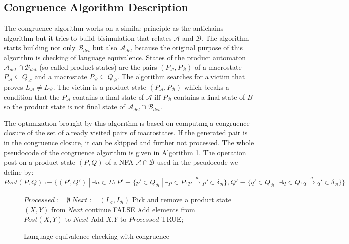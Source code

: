  \subsection{Congruence Algorithm Description}
\label{subsectCongr}
The congruence algorithm works on a similar principle as the antichains algorithm but  %
it tries to build bisimulation that relates $\mathcal{A}$ and $\mathcal{B}$. The algorithm starts building not only $\mathcal{B}_{det}$ 
but also $\mathcal{A}_{det}$ because the original purpose of this algorithm is checking of 
language equivalence. States of the product automaton $\mathcal{A}_{det} \cap \mathcal{B}_{det}$  (so-called product states) are the pairs 
$(P_\mathcal{A},P_\mathcal{B})$ of a macrostate $P_\mathcal{A} \subseteq Q_\mathcal{A}$ and a macrostate
$P_\mathcal{B} \subseteq Q_\mathcal{B}$. 
The algorithm searches for a victim that proves $L_\mathcal{A} \neq L_\mathcal{B}$. The victim is a product state $(P_\mathcal{A},P_\mathcal{B})$ 
which breaks a condition that
the $P_\mathcal{A}$ contains a final state of $\mathcal{A}$ iff $P_\mathcal{B}$ contains a final state of $B$ so the product state is not final state of 
$\mathcal{A}_{det} \cap \mathcal{B}_{det}$. 

The optimization brought by this algorithm is based on computing a congruence closure of the set of already visited pairs of macrostates. 
If the generated pair is in the congruence closure, it can be skipped and further not processed.
The whole pseudocode of the congruence algorithm is given in Algorithm \ref{algCongr}. The operation post on a product state $(P,Q)$ of a 
NFA $\mathcal{A}\cap \mathcal{B}$ used in the pseudocode we define by:\
$Post(P,Q):=\{(P',Q')\ |\ \exists a \in \Sigma: P'=
\{p'\in Q_\mathcal{B}\ |\ \exists p \in P:p\xrightarrow{a} p'\in \delta_\mathcal{B}\}, Q'=
\{q'\in Q_\mathcal{B}\ |\ \exists q \in Q:q\xrightarrow{a} q'\in \delta_\mathcal{B}\}\}$


\begin{figure}[ht]
	\begin{algorithm}[H]
		\label{algCongr}
		\KwOut{TRUE, if $L_\mathcal{A}=L_\mathcal{B}$. Otherwise FALSE.}
			$Processed$ := $\emptyset$\;
			$Next$ := $(I_\mathcal{A},I_\mathcal{B})$\;
			{
				Pick and remove a product state $(X,Y)$ from $Next$\;
				{continue\;}
				{
					\Return FALSE\;
				}
					Add elements from $Post(X,Y)$ to $Next$\;
				Add $X$,$Y$ to $Processed$\;
			}
			\Return TRUE;
		\caption{Language equivalence checking with congruence}
\end{algorithm}
\end{figure}

